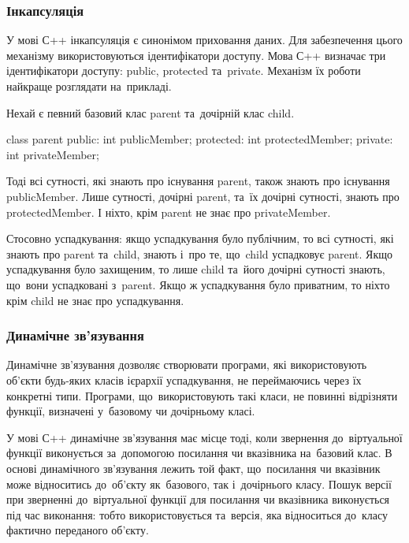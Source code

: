 \documentclass[a4paper,oneside,titlepage,14pt]{extarticle}
\begin{document}
			\subsubsection{Інкапсуляція}
				У мові С++ інкапсуляція є синонімом приховання даних. Для забезпечення цього механізму використовуються ідентифікатори доступу. Мова С++ визначає три ідентифікатори доступу: public, protected та~private. Механізм їх роботи найкраще розглядати на~прикладі.\par
				Нехай є певний базовий клас parent та~дочірній клас child.\par
\begin{cppcode}
class parent {
	public:
		int publicMember;
	protected:
		int protectedMember;
	private:
		int privateMember;
}
\end{cppcode}
\par
				Тоді всі сутності, які знають про існування parent, також знають про існування publicMember. Лише сутності, дочірні parent, та~їх дочірні сутності, знають про protectedMember. І ніхто, крім parent не знає про private\-Member.\par
				Стосовно успадкування: якщо успадкування було публічним, то всі сутності, які знають про parent та~child, знають і~про те, що~child успадковує parent. Якщо успадкування було захищеним, то лише child та~його дочірні сутності знають, що~вони успадковані з~parent. Якщо ж успадкування було приватним, то ніхто крім child не знає про успадкування.\par
			\subsubsection{Динамічне зв'язування}
				Динамічне зв'язування дозволяє створювати програми, які використовують об'єкти будь-яких класів ієрархії успадкування, не переймаючись через їх конкретні типи. Програми, що~використовують такі класи, не повинні відрізняти функції, визначені у~базовому чи дочірньому класі.\par
				У мові С++ динамічне зв'язування має місце тоді, коли звернення до~віртуальної функції виконується за~допомогою посилання чи вказівника на~базовий клас. В основі динамічного зв'язування лежить той факт, що~посилання чи вказівник може відноситись до~об'єкту як~базового, так і~дочірнього класу. Пошук версії при зверненні до~віртуальної функції для посилання чи вказівника виконується під час виконання: тобто використовується та~версія, яка відноситься до~класу фактично переданого об'єкту.\par
	\newpage
\end{document}
